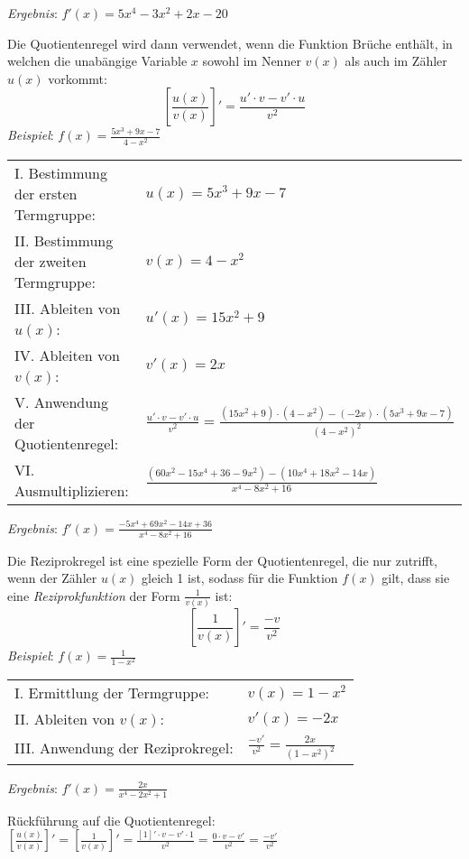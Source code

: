 \emph{Ergebnis}: $f'(x) = 5x^4 - 3x^2 + 2x - 20$

\pagebreak


Die Quotientenregel wird dann verwendet, wenn die Funktion Br\"{u}che enth\"{a}lt, in welchen die unab\"{a}ngige Variable $x$ sowohl im Nenner $v(x)$ als auch im Z\"{a}hler $u(x)$ vorkommt: $$\left[\frac{u(x)}{v(x)}\right]' = \frac{u' \cdot v - v' \cdot u}{v^2}$$
\emph{Beispiel}: $f(x) = \frac{5x^3 + 9x - 7}{4-x^2}$

\begin{tabular}{l l}
	I. Bestimmung der ersten Termgruppe: & $u(x) = 5x^3 + 9x - 7$
	\extrapar \\
	II. Bestimmung der zweiten Termgruppe: & $v(x) = 4 - x^2$
	\extrapar \\
	III. Ableiten von $u(x)$: & $u'(x) = 15x^2 + 9$
	\extrapar \\
	IV. Ableiten von $v(x)$: & $v'(x) = 2x$
	\extrapar \\
	V. Anwendung der Quotientenregel: & $\frac{u' \cdot v - v' \cdot u}{v^2} = \frac{(15x^2 + 9) \cdot (4-x^2) - (-2x) \cdot (5x^3 + 9x - 7)}{(4-x^2)^2}$
	\extrapar \\
	VI. Ausmultiplizieren: & $\frac{(60x^2 - 15x^4 + 36 - 9x^2) - (10x^4 + 18x^2 - 14x)}{x^4 - 8x^2 + 16}$
\end{tabular}

\emph{Ergebnis}: $f'(x) = \frac{-5x^4 + 69x^2 - 14x + 36}{x^4 - 8x^2 + 16}$


Die Reziprokregel ist eine spezielle Form der Quotientenregel, die nur zutrifft, wenn der Z\"{a}hler $u(x)$ gleich 1 ist, sodass f\"{u}r die Funktion $f(x)$ gilt, dass sie eine \emph{Reziprokfunktion} der Form $\frac{1}{v(x)}$ ist: $$\left[\frac{1}{v(x)}\right]' = \frac{-v}{v^2}$$
\emph{Beispiel}: $f(x) = \frac{1}{1 - x^2}$

\begin{tabular}{l l}
	I. Ermittlung der Termgruppe: & $v(x) = 1 - x^2$
	\extrapar \\
	II. Ableiten von $v(x)$: & $v'(x) = -2x$
	\extrapar \\
	III. Anwendung der Reziprokregel: & $\frac{-v'}{v^2} = \frac{2x}{(1-x^2)^2}$
\end{tabular}

\emph{Ergebnis}: $f'(x) = \frac{2x}{x^4 - 2x^2 + 1}$

R\"{u}ckf\"{u}hrung auf die Quotientenregel: \hspace{1cm} $\left[\frac{u(x)}{v(x)}\right]' = \left[\frac{1}{v(x)}\right]' = \frac{[1]' \cdot v - v' \cdot 1}{v^2} = \frac{0 \cdot v - v'}{v^2} = \frac{-v'}{v^2}$

